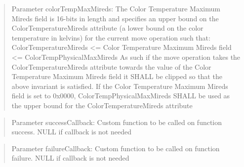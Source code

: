\begin{quote}Parameter colorTempMaxMireds: The Color Temperature Maximum Mireds field is 16-bits in length and specifies an upper bound on the ColorTemperatureMireds attribute (a lower bound on the color temperature in kelvins) for the current move operation such that: ColorTemperatureMireds <= Color Temperature Maximum Mireds field <= ColorTempPhysicalMaxMireds As such if the move operation takes the ColorTemperatureMireds attribute towards the value of the Color Temperature Maximum Mireds field it SHALL be clipped so that the above invariant is satisfied. If the Color Temperature Maximum Mireds field is set to 0x0000, ColorTempPhysicalMaxMireds SHALL be used as the upper bound for the ColorTemperatureMireds attribute\end{quote}
\begin{quote}Parameter successCallback: Custom function to be called on function success. NULL if callback is not needed\end{quote}
\begin{quote}Parameter failureCallback: Custom function to be called on function failure. NULL if callback is not needed\end{quote}


